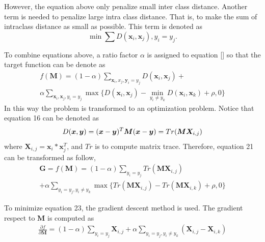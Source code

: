 \documentclass[conference,compsoc]{IEEEtran}
\begin{document}
 However, the equation above only penalize small inter class distance. Another term is needed to penalize large intra class distance. That is, to make the sum of intraclass distance as small as possible. This term is denoted as 
 \begin{equation}
 \min \sum D(\bm{x}_i,\bm{x}_j),y_i = y_j.
 \end{equation}
 
 To combine equations above, a ratio factor $\alpha$ is assigned to equation [] so that the target function can be denote as 
  \begin{equation}
  \begin{aligned}
 f(\bm{M}) = (1-\alpha)\sum_{\bm{x}_i,x_j,\bm{y}_i=y_j} D(\bm{x}_i,\bm{x}_j) + \\ 
 \alpha \sum_{\bm{x}_i,\bm{x}_j,y_i=y_j}\max\{{D(\bm{x}_i,\bm{x}_j)-\min_{y_i\ne y_k}{D(\bm{x}_i,\bm{x}_k)}+\rho,0}\}
 \end{aligned}
 \end{equation}
 In this way the problem is transformed to an optimization problem. Notice that equation 16 can be denoted as 
 \begin{equation}
 D(\bm{x},\bm{y}) = (\bm{x} - \bm{y})^T\bm{M}(\bm{x} - \bm{y})\\ = Tr(\bm{M}\bm{X}_{i,j})
 \end{equation}
 where $\bm{X}_{i,j} = \bm{x}_i*\bm{x}_j^T$, and $Tr$ is to compute matrix trace. Therefore, equation 21 can be transformed as follow,
 \begin{equation}
 \begin{aligned}
 \bm{G} = f(\bm{M}) = (1-\alpha)\sum_{y_i = y_j}Tr(\bm{M}\bm{X}_{i,j}) \\
  + \alpha \sum_{y_i = y_j,y_i\ne y_k}\max\{Tr(\bm{M}\bm{X}_{i,j}) - Tr(\bm{M}\bm{X}_{i,k} )+ \rho,0\}
 \end{aligned}
 \end{equation}
 
 To minimize equation 23, the gradient descent method is used. The gradient respect to $\bm{M}$ is computed as
 \begin{equation}
 \begin{aligned}
 \frac{\partial f}{\partial \bm{M}} = (1-\alpha) \sum_{y_i = y_j} \bm{X}_{i,j} 
 + \alpha \sum_{y_i = y_j, y_i \ne y_k}(\bm{X}_{i,j} - \bm{X}_{i,k})
 \end{aligned}
 \end{equation}
 
\end{document}

